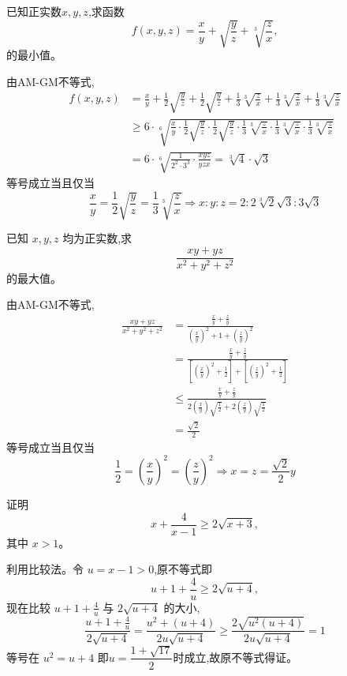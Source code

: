 \begin{questions}
    \question 已知正实数$x, y, z$,求函数
    \[
    f(x, y, z) = \frac{x}{y} + \sqrt{\frac{y}{z}} + \sqrt[3]{\frac{z}{x}},
    \]
    的最小值。
    \begin{solution}
        由AM-GM不等式,
        \begin{align*}
        f(x, y, z) &= \frac{x}{y} + \frac{1}{2}\sqrt{\frac{y}{z}} + \frac{1}{2}\sqrt{\frac{y}{z}} + \frac{1}{3}\sqrt[3]{\frac{z}{x}} + \frac{1}{3}\sqrt[3]{\frac{z}{x}} + \frac{1}{3}\sqrt[3]{\frac{z}{x}}\\
        &\ge 6 \cdot \sqrt[6]{\frac{x}{y} \cdot \frac{1}{2}\sqrt{\frac{y}{z}} \cdot \frac{1}{2}\sqrt{\frac{y}{z}} \cdot \frac{1}{3}\sqrt[3]{\frac{z}{x}} \cdot \frac{1}{3}\sqrt[3]{\frac{z}{x}} \cdot \frac{1}{3}\sqrt[3]{\frac{z}{x}}} \\ 
        &= 6 \cdot \sqrt[6]{\frac{1}{2^2 \cdot 3^3} \cdot \frac{xyz}{yzx}} = \sqrt[3]{4} \cdot \sqrt{3}
        \end{align*}
        等号成立当且仅当
        \[
        \frac{x}{y} = \frac{1}{2}\sqrt{\frac{y}{z}} = \frac{1}{3}\sqrt[3]{\frac{z}{x}} \Rightarrow x :y :z = 2 :2\sqrt[3]{2}\sqrt{3} :3\sqrt{3}
        \]
    \end{solution}

    \question 已知 $x, y, z$ 均为正实数,求 
    \[
    \frac{xy + yz}{x^2 + y^2 + z^2}
    \]
    的最大值。
    \begin{solution}
        由AM-GM不等式,
        \begin{align*}
        \frac{xy + yz}{x^2 + y^2 + z^2} 
        &= \frac{\frac{x}{y} + \frac{z}{y}}{(\frac{x}{y})^2 + 1 + (\frac{z}{y})^2} \\
        &= \frac{\frac{x}{y} + \frac{z}{y}}{[(\frac{x}{y})^2 + \frac{1}{2}] + [(\frac{z}{y})^2 + \frac{1}{2}]} \\
        &\le \frac{\frac{x}{y} + \frac{z}{y}}{2(\frac{x}{y})\sqrt{\frac{1}{2}} + 2(\frac{z}{y})\sqrt{\frac{1}{2}}} \\
        &= \frac{\sqrt{2}}{2}
        \end{align*}
        等号成立当且仅当
        \[
        \frac{1}{2} = (\frac{x}{y})^2 = (\frac{z}{y})^2 \Rightarrow x=z=\frac{\sqrt{2}}{2}y
        \]
    \end{solution}

    \question 证明 
    \[
    x + \frac{4}{x-1} \ge 2\sqrt{x+3},
    \]
    其中 $x > 1$。
    \begin{solution}
        利用比较法。令 $u = x-1 > 0$,原不等式即
        \[
        u + 1 + \frac{4}{u} \ge 2\sqrt{u+4},
        \]
        现在比较 $u + 1 + \frac{4}{u}$ 与 $2\sqrt{u+4}$ 的大小,
        \[
        \frac{u + 1 + \frac{4}{u}}{2\sqrt{u+4}} = \frac{u^2 + (u+4)}{2u\sqrt{u+4}} \ge \frac{2\sqrt{u^2(u+4)}}{2u\sqrt{u+4}} = 1
        \]
        等号在 $u^2 = u + 4$ 即$u=\dfrac{1+\sqrt{17}}{2}$时成立,故原不等式得证。
    \end{solution}


\end{questions}
